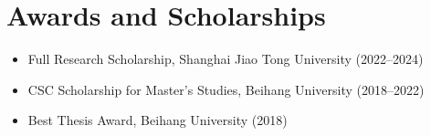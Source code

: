 \documentclass[10pt,a4paper]{article}
\begin{document}
	\section{Awards and Scholarships}
	\begin{itemize}[left=0pt, nosep]
		\item Full Research Scholarship, Shanghai Jiao Tong University (2022--2024)
		\item CSC Scholarship for Master's Studies, Beihang University (2018--2022)
		\item Best Thesis Award, Beihang University (2018)
	\end{itemize}
	
\end{document}
